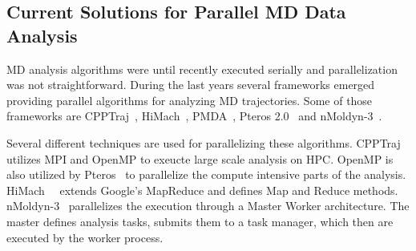 \subsection{Current Solutions for Parallel MD Data Analysis}
\label{ssec:related_work}
MD analysis algorithms were until recently executed serially and parallelization was not straightforward.
During the last years several frameworks emerged providing parallel algorithms for analyzing MD trajectories.
Some of those frameworks are CPPTraj~\cite{roe2013ptraj,roe2018parallelization}, HiMach~\cite{tiankai2008scalable}, PMDA~\cite{fan2019pmda}, Pteros 2.0~\cite{yesylevskyy2015pteros} and nMoldyn-3~\cite{hinsen2012nmoldyn}.

Several different techniques are used for parallelizing these algorithms.
CPPTraj~\cite{roe2018parallelization} utilizes MPI and OpenMP to exeucte large scale analysis on HPC.
OpenMP is also utilized by Pteros~\cite{yesylevskyy2015pteros} to parallelize the compute intensive parts of the analysis.
HiMach~~\cite{tiankai2008scalable} extends Google's MapReduce and defines Map and Reduce methods.
nMoldyn-3~\cite{hinsen2012nmoldyn} parallelizes the execution through a Master Worker architecture.
The master defines analysis tasks, submits them to a task manager, which then are executed by the worker process.



